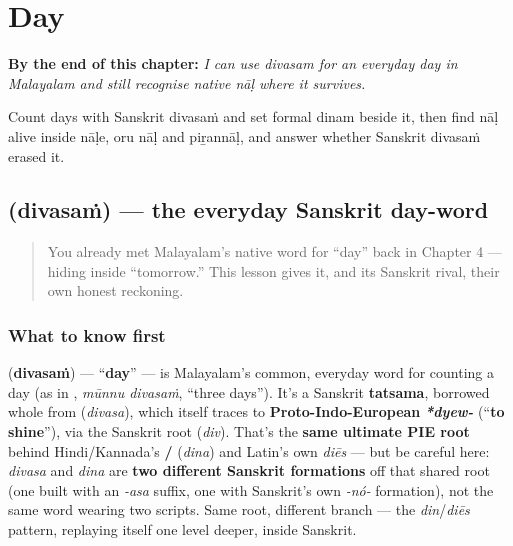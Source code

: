 
\chapter{Day}
\label{ch:ml-day}

\begin{chapteropening}
\textbf{By the end of this chapter:} \emph{I can use divasam for an everyday day in Malayalam and still recognise native nāḷ where it survives.}

Count days with Sanskrit divasaṁ and set formal dinam beside it, then find nāḷ alive inside nāḷe, oru nāḷ and piṟannāḷ, and answer whether Sanskrit divasaṁ erased it.
\end{chapteropening}

\section[\texorpdfstring{\ml{ദിവസം} (divasaṁ)}{ദിവസം (divasaṁ)}]{ (divasaṁ) — the everyday Sanskrit day-word}

\label{lesson:ML-C23-divasam}



\begin{quote}
You already met Malayalam's native word for \textquotedblleft{}day\textquotedblright{} back in Chapter 4 — hiding inside \textquotedblleft{}tomorrow.\textquotedblright{} This lesson gives it, and its Sanskrit rival, their own honest reckoning.
\end{quote}

\subsection*{What to know first}
\textbf{} (\textbf{divasaṁ}) — \textquotedblleft{}\textbf{day}\textquotedblright{} — is Malayalam's common, everyday word for counting a day (as in \textbf{ }, \emph{mūnnu divasaṁ}, \textquotedblleft{}three days\textquotedblright{}). It's a Sanskrit \textbf{tatsama}, borrowed whole from \textbf{} (\emph{divasa}), which itself traces to \textbf{Proto-Indo-European} \emph{\textbf{*dyew-}} (\textquotedblleft{}\textbf{to shine}\textquotedblright{}), via the Sanskrit root \textbf{} (\emph{div}). That's the \textbf{same ultimate PIE root} behind Hindi/Kannada's \textbf{/} (\emph{dina}) and Latin's own \emph{diēs} — but be careful here: \emph{divasa} and \emph{dina} are \textbf{two different Sanskrit formations} off that shared root (one built with an \emph{-asa} suffix, one with Sanskrit's own \emph{-nó-} formation), not the same word wearing two scripts. Same root, different branch — the \emph{din}/\emph{diēs} pattern, replaying itself one level deeper, inside Sanskrit.

